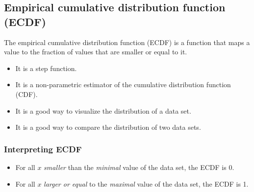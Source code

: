 \subsection{Empirical cumulative distribution function (ECDF)}
\begin{definition}
    The empirical cumulative distribution function (ECDF) is a function that maps a value to the fraction of values that are smaller or equal to it.

    \begin{itemize}
        \item It is a step function.
        \item It is a non-parametric estimator of the cumulative distribution function (CDF).
        \item It is a good way to visualize the distribution of a data set.
        \item It is a good way to compare the distribution of two data sets.
    \end{itemize}

\end{definition}

\subsubsection{Interpreting ECDF}
\begin{itemize}
    \item For all $x$ \emph{smaller} than the \emph{minimal} value of the data set, the ECDF is 0.
    \item For all $x$ \emph{larger or equal} to the \emph{maximal} value of the data set, the ECDF is 1.
\end{itemize}
